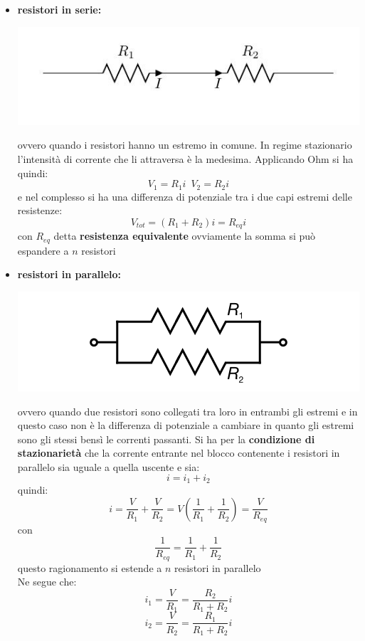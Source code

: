 \documentclass[a4paper,12pt, oneside]{book}
\begin{document}
\begin{itemize}
	\item \textbf{resistori in serie:}
	      \begin{center}
		      \includegraphics[scale=0.6]{img/ele6.jpg}
	      \end{center}
	      ovvero quando i resistori hanno un estremo in comune. In regime stazionario l'intensità di corrente che li attraversa è la medesima. Applicando Ohm si ha quindi:
	      $$V_1=R_1i\,\,\, V_2=R_2i$$
	      e nel complesso si ha una differenza di potenziale tra i due capi estremi delle resistenze:
	      $$V_{tot}=(R_1+R_2)i=R_{eq}i$$
	      con $R_{eq}$ detta \textbf{resistenza equivalente}
	      ovviamente la somma si può espandere a $n$ resistori
	\item \textbf{resistori in parallelo:}
	      \begin{center}
		      \includegraphics[scale=0.6]{img/ele7.png}
	      \end{center}
	      ovvero quando due resistori sono collegati tra loro in entrambi gli estremi e in questo caso non è la differenza di potenziale a cambiare in quanto gli estremi sono gli stessi bensì le correnti passanti. Si ha per la \textbf{condizione di stazionarietà} che la corrente entrante nel blocco contenente i resistori in parallelo sia uguale a quella uscente e sia:
	      $$i=i_1+i_2$$
	      quindi:
	      $$i=\frac{V}{R_1}+\frac{V}{R_2}=V\left(\frac{1}{R_1}+\frac{1}{R_2}\right)=\frac{V}{R_{eq}}$$
	      con $$\frac{1}{R_{eq}}=\frac{1}{R_1}+\frac{1}{R_2}$$
	      questo ragionamento si estende a $n$ resistori in parallelo
	      \\Ne segue che:
	      $$i_1=\frac{V}{R_1}=\frac{R_2}{R_1+R_2}i$$
	      $$i_2=\frac{V}{R_2}=\frac{R_1}{R_1+R_2}i$$
\end{itemize}
\end{document}
